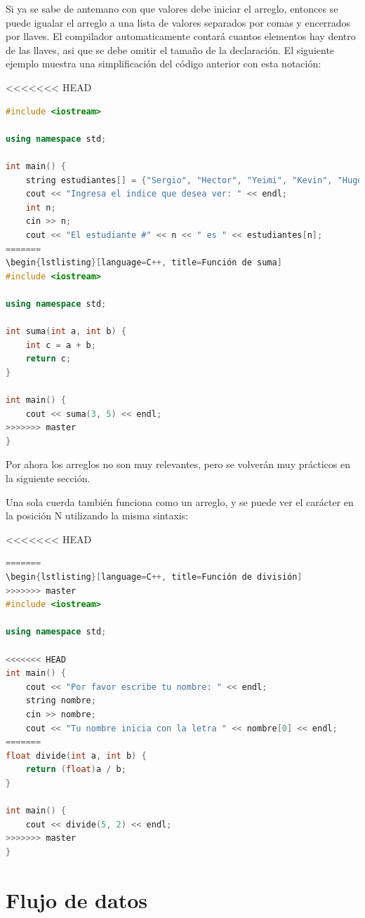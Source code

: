 \documentclass{article}
\begin{document}
Si ya se sabe de antemano con que valores debe iniciar el arreglo, entonces se puede igualar el arreglo a una lista de valores separados por comas y encerrados por llaves. El compilador automaticamente contará cuantos elementos hay dentro de las llaves, asi que se debe omitir el tamaño de la declaración. El siguiente ejemplo muestra una simplificación del código anterior con esta notación:

<<<<<<< HEAD
\begin{lstlisting}[language=C++, title=Arreglo de cuerdas]
#include <iostream>

using namespace std;

int main() {
	string estudiantes[] = {"Sergio", "Hector", "Yeimi", "Kevin", "Hugo"};
	cout << "Ingresa el indice que desea ver: " << endl;
	int n;
	cin >> n;
	cout << "El estudiante #" << n << " es " << estudiantes[n];
=======
\begin{lstlisting}[language=C++, title=Función de suma]
#include <iostream>

using namespace std;

int suma(int a, int b) {
	int c = a + b;
	return c;
}

int main() {
	cout << suma(3, 5) << endl;
>>>>>>> master
}
\end{lstlisting}

Por ahora los arreglos no son muy relevantes, pero se volverán muy prácticos en la siguiente sección.

Una sola cuerda también funciona como un arreglo, y se puede ver el carácter en la posición N utilizando la misma sintaxis:

<<<<<<< HEAD
\begin{lstlisting}[language=C++, title=Cuerdas como arreglos]
=======
\begin{lstlisting}[language=C++, title=Función de división]
>>>>>>> master
#include <iostream>

using namespace std;

<<<<<<< HEAD
int main() {
	cout << "Por favor escribe tu nombre: " << endl;
	string nombre;
	cin >> nombre;
	cout << "Tu nombre inicia con la letra " << nombre[0] << endl;
=======
float divide(int a, int b) {
	return (float)a / b;
}

int main() {
	cout << divide(5, 2) << endl;
>>>>>>> master
}
\end{lstlisting}

\section{Flujo de datos}
\end{document}

